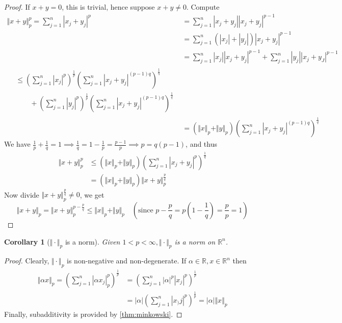 \documentclass[11pt, oneside]{book}
\theoremstyle{break}
\newtheorem*{proof}{Proof}
\newtheorem{crly}{Corollary}[section]
\newcommand{\bb}[1]{\mathbb{#1}}			%
\begin{document}
\begin{proof}
	If $x + y = 0$, this is trivial, hence suppose $x + y \neq 0$. Compute
	\begin{align*}
		\Vert x + y\Vert _p^p = \sum_{j=1}^{n} |x_j + y_j|^p &= \sum_{j=1}^{n} |x_j + y_j||x_j + y_j|^{p - 1} \\
					&= \sum_{j=1}^{n} \left( |x_j| + |y_j| \right) |x_j + y_j|^{p - 1} \\
					&= \sum_{j=1}^{n} |x_j||x_j + y_j|^{p-1} + \sum_{j=1}^{n} |y_j||x_j + y_J|^{p-1} \\
					\begin{split}
						&\leq \left( \sum_{j=1}^{n} |x_j|^p \right)^{\frac{1}{p}} \left( \sum_{j=1}^{n} |x_j + y_j|^{(p-1)q} \right)^{\frac{1}{q} } \\
						 &\qquad + \left( \sum_{j=1}^{n} |y_j|^p \right)^{\frac{1}{p}} \left( \sum_{j=1}^{n} |x_j + y_j|^{(p-1)q} \right)^{\frac{1}{q}}
					\end{split} \\
					&= (\Vert x\Vert _p + \Vert y\Vert _p) \left( \sum_{j=1}^{n} |x_j + y_j|^{(p-1)q} \right)^{\frac{1}{q}}
	\end{align*}
	We have $\frac{1}{p} + \frac{1}{q} = 1 \implies \frac{1}{q} = 1 - \frac{1}{p} = \frac{p-1}{p} \implies p = q(p - 1)$, and thus
	\begin{align*}
		\Vert x + y\Vert _p^p &\leq (\Vert x\Vert _p + \Vert y\Vert _p) \left(\sum_{j=1}^{n} |x_j + y_j|^p \right)^{\frac{1}{q} } \\
					&= (\Vert x\Vert _p + \Vert y\Vert _p) \Vert x + y\Vert _p^\frac{p}{q} 
	\end{align*}
	Now divide $\Vert x + y\Vert _p^\frac{p}{q}  \neq 0$, we get
	\begin{equation}
		\Vert x + y\Vert _p = \Vert x + y\Vert _p^{p - \frac{p}{q}} \leq \Vert x\Vert _p + \Vert y\Vert _p \quad (\text{since } p - \frac{p}{q} = p(1 - \frac{1}{q}) = \frac{p}{p} = 1)
	\end{equation}
\end{proof}

\begin{crly}[$\Vert \cdot\Vert _p$ is a norm]
	Given $1 < p < \infty, \Vert \cdot\Vert _p$ is a norm on $\bb{R}^n$.
\end{crly}

\begin{proof}
	Clearly, $\Vert \cdot\Vert _p$ is non-negative and non-degenerate. If $\alpha \in \bb{R}, x \in \bb{R}^n$ then
	\begin{align*}
		\Vert \alpha x\Vert _p = \left( \sum_{j=1}^{n} |\alpha x_j|_p^p \right)^{\frac{1}{p}} &= \left( \sum_{j=1}^{n} |\alpha|^p|x_j|^p \right)^{\frac{1}{p}} \\
						&= |\alpha| \left( \sum_{j=1}^{n} |x_)j|^p \right)^{\frac{1}{p}} = |\alpha|\Vert x \Vert_p
	\end{align*}
	Finally, subadditivity is provided by \autoref{thm:minkowski}.
\end{proof}
\end{document}
